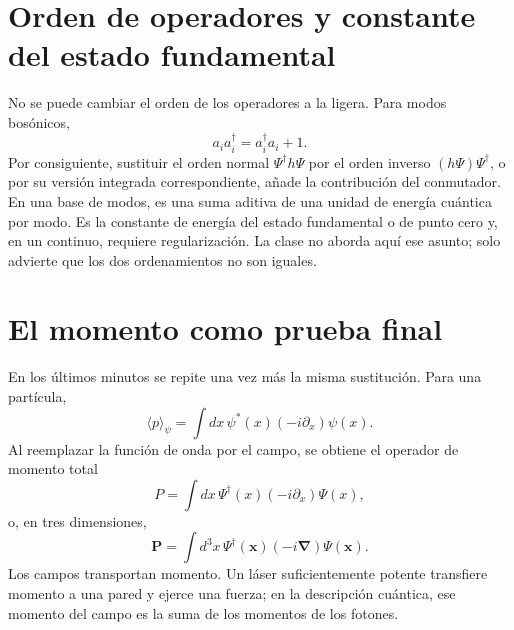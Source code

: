 \section{Orden de operadores y constante del estado fundamental}

No se puede cambiar el orden de los operadores a la ligera. Para modos bosónicos,
\begin{equation}
a_i a_i^\dagger=a_i^\dagger a_i+1.
\end{equation}
Por consiguiente, sustituir el orden normal \(\Psi^\dagger h\Psi\) por el orden inverso \((h\Psi)\Psi^\dagger\), o por su versión integrada correspondiente, añade la contribución del conmutador. En una base de modos, es una suma aditiva de una unidad de energía cuántica por modo. Es la constante de energía del estado fundamental o de punto cero y, en un continuo, requiere regularización. La clase no aborda aquí ese asunto; solo advierte que los dos ordenamientos no son iguales.

\begin{classroomqa}
\end{classroomqa}

\section{El momento como prueba final}

En los últimos minutos se repite una vez más la misma sustitución. Para una partícula,
\begin{equation}
\langle p\rangle_\psi
=\int dx\,\psi^*(x)\left(-i\partial_x\right)\psi(x).
\label{eq:l07-one-particle-momentum}
\end{equation}
Al reemplazar la función de onda por el campo, se obtiene el operador de momento total
\begin{equation}
P=\int dx\,\Psi^\dagger(x)\left(-i\partial_x\right)\Psi(x),
\label{eq:l07-field-momentum}
\end{equation}
o, en tres dimensiones,
\begin{equation}
\mathbf P=\int d^3x\,\Psi^\dagger(\mathbf x)
\left(-i\boldsymbol\nabla\right)\Psi(\mathbf x).
\end{equation}
Los campos transportan momento. Un láser suficientemente potente transfiere momento a una pared y ejerce una fuerza; en la descripción cuántica, ese momento del campo es la suma de los momentos de los fotones.

